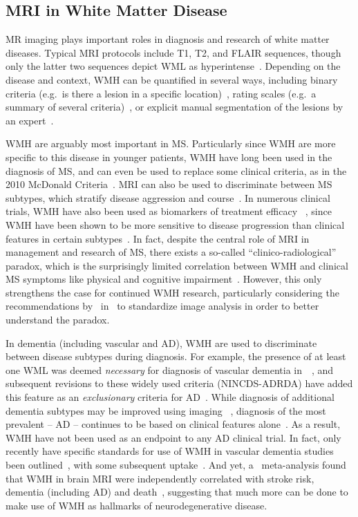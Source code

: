 \subsection{MRI in White Matter Disease}
MR imaging plays important roles in diagnosis and research of white matter diseases.
Typical MRI protocols include T1, T2, and FLAIR sequences,
though only the latter two sequences depict WML as hyperintense~\cite{Simon2006,Wardlaw2013}.
Depending on the disease and context, WMH can be quantified in several ways,
including binary criteria (e.g.\ is there a lesion in a specific location)~\cite{Polman2011},
rating scales (e.g.\ a summary of several criteria)~\cite{Fazekas1987},
or explicit manual segmentation of the lesions by an expert~\cite{Egger2017}.
\par
WMH are arguably most important in MS.
Particularly since WMH are more specific to this disease in younger patients,
WMH have long been used in the diagnosis of MS,
and can even be used to replace some clinical criteria,
as in the 2010 McDonald Criteria~\cite{Polman2011}.
MRI can also be used to discriminate between MS subtypes,
which stratify disease aggression and course~\cite{Polman2011,Lublin2014,Traboulsee2015}.
In numerous clinical trials, WMH have also been used as biomarkers of treatment efficacy%
~\cite{Sormani2013,Fahrbach2013,Ziemssen2015},
since WMH have been shown to be more sensitive to disease progression than clinical features
in certain subtypes~\cite{ORiordan1998}.
In fact, despite the central role of MRI in management and research of MS,
there exists a so-called ``clinico-radiological'' paradox,
which is the surprisingly limited correlation between WMH and clinical MS symptoms
like physical and cognitive impairment~\cite{Mollison2017}.
However, this only strengthens the case for continued WMH research,
particularly considering the recommendations by~\citeauthor{Mollison2017} in~\cite{Mollison2017}
to standardize image analysis in order to better understand the paradox.
\par
In dementia (including vascular and AD),
WMH are used to discriminate between disease subtypes during diagnosis.
For example, the presence of at least one WML was deemed \textit{necessary}
for diagnosis of vascular dementia in~\citeyear{Roman1993}~\cite{Roman1993},
and subsequent revisions to these widely used criteria (NINCDS-ADRDA)
have added this feature as an \textit{exclusionary} criteria for AD~\cite{Dubois2007}.
While diagnosis of additional dementia subtypes may be improved using imaging%
~\cite{Sorbi2012,Verhagen2016}, diagnosis of the most prevalent -- AD --
continues to be based on clinical features alone~\cite{McKhann2011}.
As a result, WMH have not been used as an endpoint to any AD clinical trial.
In fact, only recently have specific standards for
use of WMH in vascular dementia studies been outlined~\cite{Wardlaw2015,Wardlaw2013},
with some subsequent uptake~\cite{VanWesten2016}.
And yet, a~\citeyear{Debette2010} meta-analysis found that
WMH in brain MRI were independently correlated with
stroke risk, dementia (including AD) and death~\cite{Debette2010},
suggesting that much more can be done to make use of WMH as hallmarks of neurodegenerative disease.
